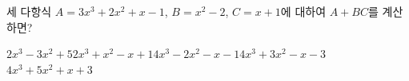 세 다항식 $A=3x^3+2x^2+x-1$, $B=x^2-2$, $C=x+1$에 대하여 $A+BC$를 계산하면?
\begin{choicesii}{$2x^3-3x^2+5$}{$2x^3+x^2-x+1$}{$4x^3-2x^2-x-1$}{$4x^3+3x^2-x-3$}{$4x^3+5x^2+x+3$}\end{choicesii}
